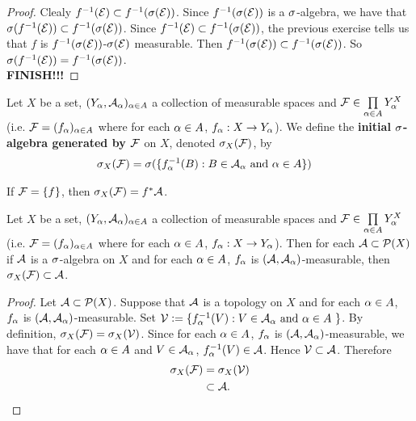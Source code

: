 \documentclass{book}
\begin{document}
	\begin{proof}
		Clealy $f^{-1}(\mathcal{E}) \subset f^{-1}(\sigma(\mathcal{E}))$. Since $f^{-1}(\sigma(\mathcal{E}))$ is a $\sigma$-algebra, we have that $\sigma(f^{-1}(\mathcal{E})) \subset f^{-1}(\sigma(\mathcal{E}))$. Since $f^{-1}(\mathcal{E}) \subset f^{-1}(\sigma(\mathcal{E}))$, the previous exercise tells us that $f$ is $f^{-1}(\sigma(\mathcal{E}))$-$\sigma(\mathcal{E})$ measurable. Then $f^{-1}(\sigma(\mathcal{E})) \subset f^{-1}(\sigma(\mathcal{E}))$. So $\sigma(f^{-1}(\mathcal{E})) = f^{-1}(\sigma(\mathcal{E}))$.  \\
		\textbf{FINISH!!!}
	\end{proof}
	
	\begin{defn} 
		Let $X$ be a set, $(Y_{\alpha}, \mathcal{A}_{\alpha})_{\alpha \in A}$ a collection of measurable spaces and $\mathcal{F} \in \prod \limits_{\alpha \in A}Y_{\alpha}^X$ (i.e. $\mathcal{F} = (f_{\alpha})_{\alpha \in A}$ where for each $\alpha \in A$, $f_{\alpha}:X \rightarrow Y_{\alpha}$). We define the \textbf{initial $\sigma$-algebra generated by $\mathcal{F}$} on $X$, denoted $\sigma_X(\mathcal{F})$, by 
		\begin{align*}
			\sigma_X(\mathcal{F}) 
			&= \sigma(\{f_{\alpha}^{-1}(B): B \in \mathcal{A}_{\alpha} \text{ and } \alpha \in A \})
		\end{align*}	 
	\end{defn}
	
	\begin{note}
		If $\mathcal{F} = \{f\}$, then $\sigma_X(\mathcal{F}) = f^*\mathcal{A}$.
	\end{note}

	\begin{ex} 
		Let $X$ be a set, $(Y_{\alpha}, \mathcal{A}_{\alpha})_{\alpha \in A}$ a collection of measurable spaces and $\mathcal{F} \in \prod \limits_{\alpha \in A}Y_{\alpha}^X$ (i.e. $\mathcal{F} = (f_{\alpha})_{\alpha \in A}$ where for each $\alpha \in A$, $f_{\alpha}:X \rightarrow Y_{\alpha}$). Then for each $\mathcal{A} \subset \mathcal{P}(X)$ if $\mathcal{A}$ is a $\sigma$-algebra on $X$ and for each $\alpha \in A$, $f_{\alpha}$ is $(\mathcal{A}, \mathcal{A}_{\alpha})$-measurable, then $\sigma_X(\mathcal{F}) \subset \mathcal{A}$.
	\end{ex}
	
	\begin{proof}
		Let $\mathcal{A} \subset \mathcal{P}(X)$. Suppose that $\mathcal{A}$ is a topology on $X$ and for each $\alpha \in A$, $f_{\alpha}$ is $(\mathcal{A}, \mathcal{A}_{\alpha})$-measurable. Set $\mathcal{V} \vcentcolon= \{f_{\alpha}^{-1}(V): \text{$V \in \mathcal{A}_{\alpha}$ and $\alpha \in A$ }\}$. By definition, $\sigma_X(\mathcal{F}) = \sigma_X(\mathcal{V})$. Since for each $\alpha \in A$, $f_{\alpha}$ is $(\mathcal{A}, \mathcal{A}_{\alpha})$-measurable, we have that for each $\alpha \in A$ and $V \in \mathcal{A}_{\alpha}$, $f_{\alpha}^{-1}(V) \in \mathcal{A}$. Hence $\mathcal{V} \subset \mathcal{A}$. Therefore
		\begin{align*}
			\sigma_X(\mathcal{F})
			& = \sigma_X(\mathcal{V}) \\
			& \subset \mathcal{A}.
		\end{align*}
	\end{proof}
	
\end{document}

